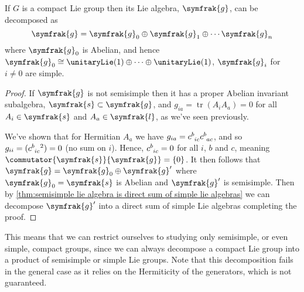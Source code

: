 \documentclass[fleqn]{NotesClass}
\renewcommand{\lie}[1]{\symfrak{#1}}
\newcommand{\isomorphic}{\cong}
\DeclareMathOperator{\tr}{tr}
\begin{document}
    \begin{thm}{}{}
        If \(G\) is a compact Lie group then its Lie algebra, \(\lie{g}\), can be decomposed as
        \begin{equation}
            \lie{g} = \lie{g}_0 \oplus \lie{g}_1 \oplus \dotsb \lie{g}_n
        \end{equation}
        where \(\lie{g}_0\) is Abelian, and hence \(\lie{g}_0 \isomorphic \unitaryLie(1) \oplus \dotsb \oplus \unitaryLie(1)\), \(\lie{g}_i\) for \(i \ne 0\) are simple.
        \begin{proof}
            If \(\lie{g}\) is not semisimple then it has a proper Abelian invariant subalgebra, \(\lie{s} \subset \lie{g}\), and \(g_{ia} = \tr(A_i A_a) = 0\) for all \(A_i \in \lie{s}\) and \(A_a \in \lie{l}\), as we've seen previously.
            
            We've shown that for Hermitian \(A_a\) we have \(g_{ia} = \tensor{c}{^b_{ic}} \tensor{c}{^b_{ac}}\), and so \(g_{ii} = (\tensor{c}{^b_{ic}}^2) = 0\) (no sum on \(i\)).
            Hence, \(\tensor{c}{^b_{ic}} = 0\) for all \(i\), \(b\) and \(c\), meaning \(\commutator{\lie{s}}{\lie{g}} = \{0\}\).
            It then follows that \(\lie{g} = \lie{g}_0 \oplus \lie{g}'\) where \(\lie{g}_0 = \lie{s}\) is Abelian and \(\lie{g}'\) is semisimple.
            Then by \cref{thm:semisimple lie algebra is direct sum of simple lie algebras} we can decompose \(\lie{g}'\) into a direct sum of simple Lie algebras completing the proof.
        \end{proof}
    \end{thm}
    
    This means that we can restrict ourselves to studying only semisimple, or even simple, compact groups, since we can always decompose a compact Lie group into a product of semisimple or simple Lie groups.
    Note that this decomposition fails in the general case as it relies on the Hermiticity of the generators, which is not guaranteed.
    
\end{document}
